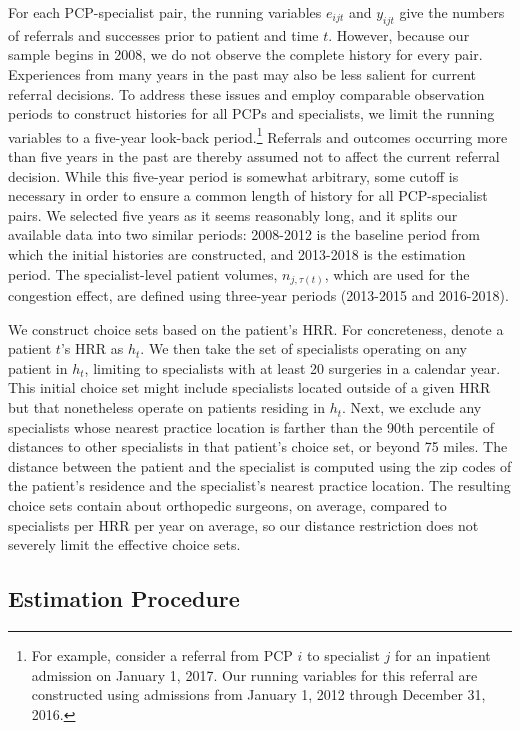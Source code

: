 \documentclass[12pt]{article}
\begin{document}
For each PCP-specialist pair, the running variables $e_{ijt}$ and $y_{ijt}$ give the numbers of referrals and successes prior to patient and time $t$. However, because our sample begins in 2008, we do not observe the complete history for every pair. Experiences from many years in the past may also be less salient for current referral decisions. To address these issues and employ comparable observation periods to construct histories for all PCPs and specialists, we limit the running variables to a five-year look-back period.\footnote{For example, consider a referral from PCP $i$ to specialist $j$ for an inpatient admission on January 1, 2017. Our running variables for this referral are constructed using admissions from January 1, 2012 through December 31, 2016.} Referrals and outcomes occurring more than five years in the past are thereby assumed not to affect the current referral decision. While this five-year period is somewhat arbitrary, some cutoff is necessary in order to ensure a common length of history for all PCP-specialist pairs. We selected five years as it seems reasonably long, and it splits our available data into two similar periods: 2008-2012 is the baseline period from which the initial histories are constructed, and 2013-2018 is the estimation period. The specialist-level patient volumes, $n_{j, \tau(t)}$, which are used for the congestion effect, are defined using three-year periods (2013-2015 and 2016-2018).
 
We construct choice sets based on the patient's HRR. For concreteness, denote a patient $t$'s HRR as $h_{t}$. We then take the set of specialists operating on any patient in $h_{t}$, limiting to specialists with at least 20 surgeries in a calendar year. This initial choice set might include specialists located outside of a given HRR but that nonetheless operate on patients residing in $h_{t}$. Next, we exclude any specialists whose nearest practice location is farther than the 90th percentile of distances to other specialists in that patient's choice set, or beyond 75 miles. The distance between the patient and the specialist is computed using the zip codes of the patient's residence and the specialist's nearest practice location. The resulting choice sets contain about \meanChoiceSet{} orthopedic surgeons, on average, compared to \specsPerHRRYear{} specialists per HRR per year on average, so our distance restriction does not severely limit the effective choice sets.


\subsection{Estimation Procedure}
\label{sec:estimation}
\end{document}
